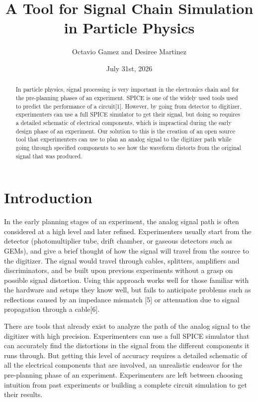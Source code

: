 \documentclass[10pt]{article}
\title{A Tool for Signal Chain Simulation in Particle Physics}
\author{Octavio Gamez and Desiree Martinez}
\date{July 31st, 2026}
\begin{document}
\maketitle

\begin{abstract}
In particle physics, signal processing is very important in the electronics chain and for the pre-planning phases of an experiment. SPICE is one of the widely used tools used to predict the performance of a circuit[1]. However, by going from detector to digitizer, experimenters can use a full SPICE simulator to get their signal, but doing so requires a detailed schematic of electrical components, which is impractical during the early design phase of an experiment. Our solution to this is the creation of an open source tool that experimenters can use to plan an analog signal to the digitizer path while going through specified components to see how the waveform distorts from the original signal that was produced.
  
\end{abstract}

\section{Introduction}

In the early planning stages of an experiment, the analog signal path is often considered at a high level and later refined. Experimenters usually start from the detector (photomultiplier tube, drift chamber, or gaseous detectors such as GEMs), and give a brief thought of how the signal will travel from the source to the digitizer. The signal would travel through cables, splitters, amplifiers and discriminators, and be built upon previous experiments without a grasp on possible signal distortion. Using this approach works well for those familiar with the hardware and setups they know well, but fails to anticipate problems such as reflections caused by an impedance mismatch [5] or attenuation due to signal propagation through a cable[6]. 

There are tools that already exist to analyze the path of the analog signal to the digitizer with high precision. Experimenters can use a full SPICE simulator that can accurately find the distortions in the signal from the different components it runs through. But getting this level of accuracy requires a detailed schematic of all the electrical components that are involved, an unrealistic endeavor for the pre-planning phase of an experiment. Experimenters are left between choosing intuition from past experiments or building a complete circuit simulation to get their results.
\end{document}
